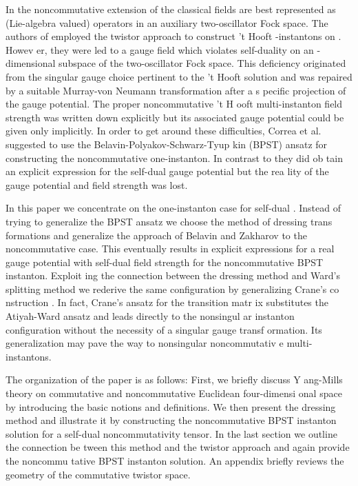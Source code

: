 \documentclass[a4paper,11pt,english]{article}
\numberwithin{equation}{section}
\renewcommand{\=}{\ =\ }
\begin{document}
In the noncommutative extension of \coordHE{} 
the classical fields are best represented
as (Lie-algebra valued) operators in an auxiliary two-oscillator Fock space.
The authors of \cite{Lechtenfeld:2001ie} employed the twistor approach to %
 construct \coordHE{} 't Hooft \coordHE{}-instantons on \coordHE{}. Howev%
er, they were led to a gauge field which violates self-duality on an %
 \coordHE{}-dimensional subspace of the two-oscillator Fock space. This deficiency 
originated from the singular gauge choice pertinent to the 't Hooft solution
and was repaired by a suitable Murray-von Neumann transformation after a s%
pecific projection of the gauge potential. The proper noncommutative 't H%
ooft multi-instanton field strength was written down explicitly but its %
associated gauge potential could be given only implicitly. 
In order to get around these difficulties, Correa et al. \cite{Correa:2001wv} 
suggested to use the Belavin-Polyakov-Schwarz-Tyup%
kin (BPST) \cite{Belavin:fg} ansatz for constructing the noncommutative \coordHE{} one-instanton. In contrast to \cite{Lechtenfeld:2001ie} they did ob%
tain an explicit expression for the self-dual gauge potential but the rea%
lity of the gauge potential and field strength was lost.  

In this paper we concentrate on the one-instanton case for 
self-dual \coordHE{}. Instead of trying %
 to generalize the BPST ansatz \cite{Belavin:fg} 
we choose the method of dressing trans%
formations and generalize the approach of Belavin and Zakharov 
\cite{Belavin:cz} to the noncommutative case. 
This eventually results in explicit 
expressions for a real gauge potential with self-dual field strength for 
the noncommutative \coordHE{} BPST instanton. Exploit%
ing the connection between the dressing method and Ward's splitting method we %
 rederive the same configuration by generalizing Crane's co%
nstruction \cite{Crane:im}. In fact, Crane's ansatz for the transition matr%
ix substitutes the Atiyah-Ward ansatz and leads directly to the nonsingul%
ar instanton configuration without the necessity of a singular gauge transf%
ormation. Its generalization may pave the way to nonsingular noncommutativ%
e multi-instantons.

The organization of the paper is as follows: First, we briefly discuss Y%
ang-Mills theory on commutative and noncommutative Euclidean four-dimensi%
onal space by introducing the basic notions and definitions. We then present %
the dressing method and illustrate it by constructing the noncommutative  
\coordHE{} BPST instanton solution for a self-dual noncommutativity tensor.  
In the last section we outline the connection be%
tween this method and the twistor approach and again provide the noncommu%
tative BPST instanton solution. An appendix briefly reviews the geometry of the
commutative twistor space.
\end{document}
